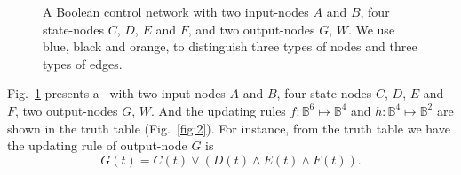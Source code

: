 \begin{example}
	 \begin{figure}[thpb]
		\centering
		
		\caption{A Boolean control network with two input-nodes $A$ and $B$, four state-nodes $C$, $D$, $E$ and $F$, and two output-nodes $G$, $W$. We use blue, black and orange, to distinguish three types of nodes and three types of edges.}
		\label{fig:1}
	\end{figure}
	
Fig.~\ref{fig:1} presents a \BCN\ with two input-nodes $A$ and $B$, four state-nodes $C$, $D$, $E$ and $F$, two output-nodes $G$, $W$. 
%
And the updating rules $f:\mathbb{B}^{6}\mapsto \mathbb{B}^4$ and $h:\mathbb{B}^4\mapsto \mathbb{B}^2$ are shown in the truth table (Fig.~\ref{fig:2}).  
For instance, from the truth table we have the updating rule of output-node $G$ is 
\[G(t)=C(t)\vee {({D}(t)\wedge { E}(t)\wedge {F}(t))}.\]

\end{example}
